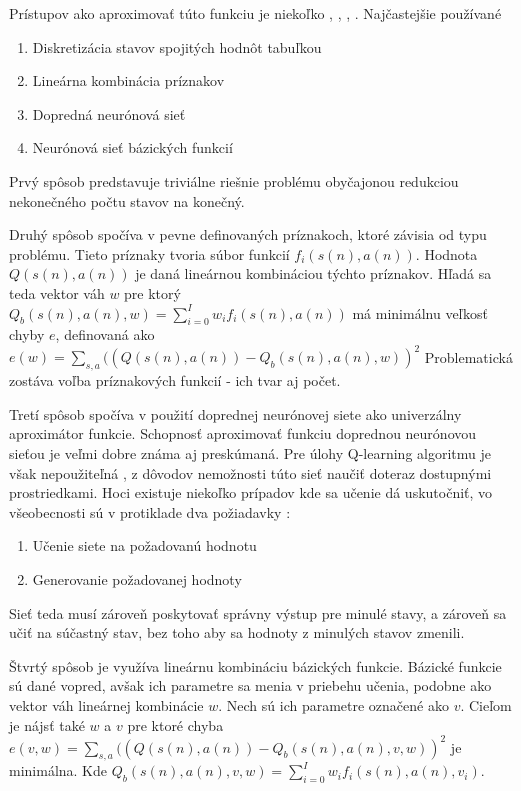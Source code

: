 Prístupov ako aproximovať túto funkciu je niekoľko \cite{bib:aproximation_01},
\cite{bib:aproximation_02}, \cite{bib:aproximation_03}, \cite{bib:aproximation_04}.
Najčastejšie používané
\begin{enumerate}
  \item Diskretizácia stavov spojitých hodnôt tabuľkou
  \item Lineárna kombinácia príznakov
  \item Dopredná neurónová sieť
  \item Neurónová sieť bázických funkcií
\end{enumerate}

Prvý spôsob predstavuje triviálne riešnie problému obyčajonou redukciou nekonečného
počtu stavov na konečný.

Druhý spôsob spočíva v pevne definovaných príznakoch, ktoré závisia od typu
problému. Tieto príznaky tvoria súbor funkcií $f_{i}(s(n),a(n))$. Hodnota $Q(s(n), a(n))$
je daná lineárnou kombináciou týchto príznakov. Hľadá sa teda vektor váh
$w$ pre ktorý  $Q_b(s(n), a(n), w) = \sum\limits_{i=0}^{I}w_i f_{i}(s(n),a(n))$
má minimálnu veľkosť chyby $e$, definovaná ako
$e(w) = \sum\limits_{s,a} ((Q(s(n), a(n))- Q_b(s(n), a(n), w))^2$
Problematická zostáva voľba príznakových funkcií - ich tvar aj počet.

Tretí spôsob spočíva v použití doprednej neurónovej siete ako univerzálny aproximátor funkcie.
Schopnosť aproximovať funkciu doprednou neurónovou sieťou je veľmi dobre známa aj preskúmaná.
Pre úlohy Q-learning algoritmu je však nepoužiteľná \cite{bib:q_fnn_problem}
, z dôvodov nemožnosti túto sieť naučiť doteraz dostupnými prostriedkami. Hoci existuje niekoľko prípadov kde sa učenie dá
uskutočniť, vo všeobecnosti sú v protiklade dva požiadavky :
\begin{enumerate}
  \item Učenie siete na požadovanú hodnotu
  \item Generovanie požadovanej hodnoty
\end{enumerate}

Sieť teda musí zároveň poskytovať správny výstup pre minulé stavy, a zároveň sa
učiť na súčastný stav, bez toho aby sa hodnoty z minulých stavov zmenili.

Štvrtý spôsob je využíva lineárnu kombináciu bázických funkcie.
Bázické funkcie sú dané vopred, avšak ich parametre sa menia v priebehu učenia,
podobne ako vektor váh lineárnej kombinácie $w$. Nech sú ich parametre označené
ako $v$. Cieľom je nájsť také $w$ a $v$ pre ktoré chyba
$e(v, w) = \sum\limits_{s,a} ((Q(s(n), a(n))- Q_b(s(n), a(n), v, w))^2$
je minimálna. Kde $Q_b(s(n), a(n), v, w) = \sum\limits_{i=0}^{I}w_i f_{i}(s(n),a(n), v_i)$.

